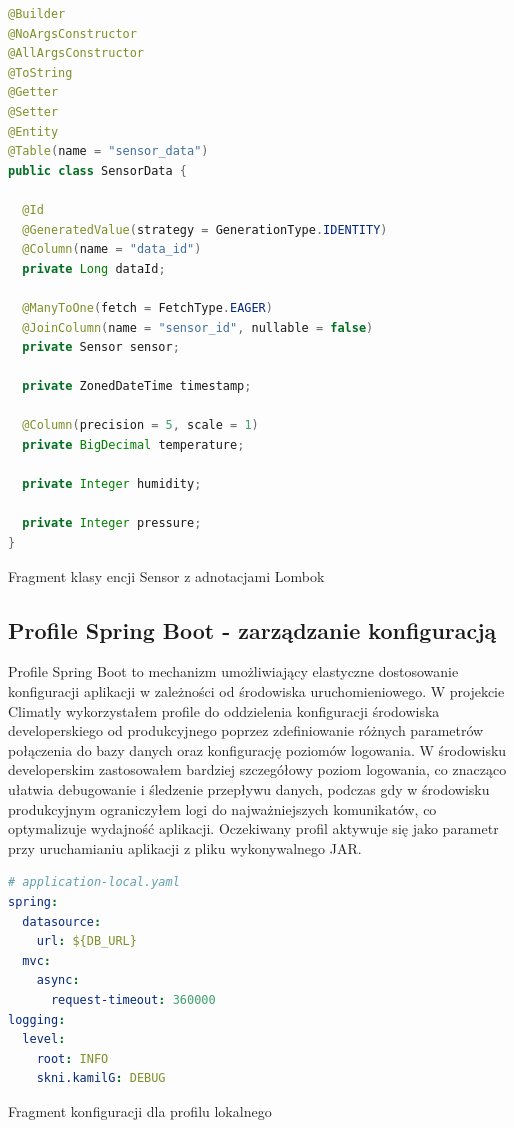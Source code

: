 \documentclass[a4paper,12pt,openany]{book}
\begin{document}
\begin{lstfloat}[htbp]
\begin{lstlisting}[language=java]
@Builder
@NoArgsConstructor
@AllArgsConstructor
@ToString
@Getter
@Setter
@Entity
@Table(name = "sensor_data")
public class SensorData {

  @Id
  @GeneratedValue(strategy = GenerationType.IDENTITY)
  @Column(name = "data_id")
  private Long dataId;

  @ManyToOne(fetch = FetchType.EAGER)
  @JoinColumn(name = "sensor_id", nullable = false)
  private Sensor sensor;

  private ZonedDateTime timestamp;

  @Column(precision = 5, scale = 1)
  private BigDecimal temperature;

  private Integer humidity;

  private Integer pressure;
}
\end{lstlisting}
\caption{Fragment klasy encji Sensor z adnotacjami Lombok}
\label{lst:lombok}
\end{lstfloat}
\vfill

\vspace{2cm}

\subsection*{Profile Spring Boot - zarządzanie konfiguracją}

Profile Spring Boot to mechanizm umożliwiający elastyczne dostosowanie konfiguracji aplikacji w zależności od środowiska uruchomieniowego. W projekcie Climatly wykorzystałem profile do oddzielenia konfiguracji środowiska developerskiego od produkcyjnego poprzez zdefiniowanie różnych parametrów połączenia do bazy danych oraz konfigurację poziomów logowania. W środowisku developerskim zastosowałem bardziej szczegółowy poziom logowania, co znacząco ułatwia debugowanie i śledzenie przepływu danych, podczas gdy w środowisku produkcyjnym ograniczyłem logi do najważniejszych komunikatów, co optymalizuje wydajność aplikacji. Oczekiwany profil aktywuje się jako parametr przy uruchamianiu aplikacji z pliku wykonywalnego JAR.

\begin{lstfloat}[H]
\begin{lstlisting}[language=yaml]
# application-local.yaml
spring:
  datasource:
    url: ${DB_URL}
  mvc:
    async:
      request-timeout: 360000
logging:
  level:
    root: INFO
    skni.kamilG: DEBUG
\end{lstlisting}
\caption{Fragment konfiguracji dla profilu lokalnego}
\label{lst:profile-local}
\end{lstfloat}
\end{document}
